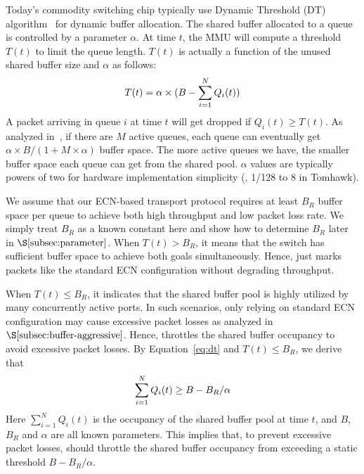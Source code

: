 Today's commodity switching chip typically use Dynamic Threshold (DT) algorithm~\cite{dt} for dynamic buffer allocation. The shared buffer allocated to a queue is controlled by a parameter $\alpha$. At time $t$, the MMU will compute a threshold $T(t)$ to limit the queue length. $T(t)$ is actually a function of the unused shared buffer size and $\alpha$ as follows:
\vspace{-2mm}
\begin{equation}
\vspace{-1mm}
T(t)=\alpha\times(B-\displaystyle\sum_{i=1}^{N} Q_{i}(t))\label{eq:dt}
\vspace{-1mm}
\end{equation}
A packet arriving in queue $i$ at time $t$ will get dropped if $Q_{i}(t)\geq T(t)$. As analyzed in~\cite{dt}, if there are $M$ active queues, each queue can eventually get $\alpha\times B/(1+M\times \alpha)$ buffer space. The more active queues we have, the smaller buffer space each queue can get from the shared pool. $\alpha$ values are typically powers of two for hardware implementation simplicity (\eg, 1/128 to 8 in Tomhawk).

We assume that our ECN-based transport protocol requires at least $B_R$ buffer space per queue to achieve both high throughput and low packet loss rate. We simply treat $B_R$ as a known constant here and show how to determine $B_R$ later in $\S\ref{subsec:parameter}$. When $T(t) > B_R$, it means that the switch has sufficient buffer space to achieve both goals simultaneously. Hence, \sys just marks packets like the standard ECN configuration without degrading throughput.

When $T(t) \leq B_R$, it indicates that the shared buffer pool is highly utilized by many concurrently active ports. In such scenarios, only relying on standard ECN configuration may cause excessive packet losses as analyzed in $\S\ref{subsec:buffer-aggressive}$. Hence, \sys throttles the shared buffer occupancy to avoid excessive packet losses. By Equation~\ref{eq:dt} and $T(t)\leq B_R$, we derive that
\vspace{-2mm}
\begin{equation}
\vspace{-1mm}
\displaystyle\sum_{i=1}^{N} Q_{i}(t)\geq B-B_{R}/\alpha\label{eq:shared_buffer}
\vspace{-1mm}
\end{equation}
Here $\displaystyle\sum_{i=1}^{N} Q_{i}(t)$ is the occupancy of the shared buffer pool at time $t$, and $B$, $B_{R}$ and $\alpha$ are all known parameters. This implies that, to prevent excessive packet losses, \sys should throttle the shared buffer occupancy from exceeding a static threshold $B-B_{R}/\alpha$.


